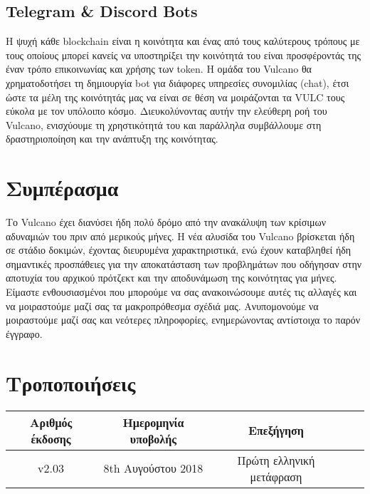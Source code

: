 \documentclass[A4paper, 12pt]{article}
\begin{document}
\subsection{Telegram \& Discord Bots}
Η ψυχή κάθε blockchain είναι η κοινότητα και ένας από τους καλύτερους τρόπους με τους οποίους μπορεί κανείς να υποστηρίξει την κοινότητά του είναι προσφέροντάς της έναν τρόπο επικοινωνίας και χρήσης των token. Η ομάδα του Vulcano θα χρηματοδοτήσει τη δημιουργία bot για διάφορες υπηρεσίες συνομιλίας (chat), έτσι ώστε τα μέλη της κοινότητάς μας να είναι σε θέση να μοιράζονται τα VULC τους εύκολα με τον υπόλοιπο κόσμο. Διευκολύνοντας αυτήν την ελεύθερη ροή του Vulcano, ενισχύουμε τη χρηστικότητά του και παράλληλα συμβάλλουμε στη δραστηριοποίηση και την ανάπτυξη της κοινότητας.

\section{Συμπέρασμα}
Το Vulcano έχει διανύσει ήδη πολύ δρόμο από την ανακάλυψη των κρίσιμων αδυναμιών του πριν από μερικούς μήνες. Η νέα αλυσίδα του Vulcano βρίσκεται ήδη σε στάδιο δοκιμών, έχοντας διευρυμένα χαρακτηριστικά, ενώ έχουν καταβληθεί ήδη σημαντικές προσπάθειες για την αποκατάσταση των προβλημάτων που οδήγησαν στην αποτυχία του αρχικού πρότζεκτ και την αποδυνάμωση της κοινότητας για μήνες. Είμαστε ενθουσιασμένοι που μπορούμε να σας ανακοινώσουμε αυτές τις αλλαγές και να μοιραστούμε μαζί σας τα μακροπρόθεσμα σχέδιά μας. Ανυπομονούμε να μοιραστούμε μαζί σας και νεότερες πληροφορίες, ενημερώνοντας αντίστοιχα το παρόν έγγραφο.

\newpage
\section{Τροποποιήσεις}

\begin{table}[h]
\centering
\begin{tabular}{@{}ccccc@{}}
\toprule
Αριθμός έκδοσης & Ημερομηνία υποβολής & Επεξήγηση \\ \midrule
v2.03 & 8th Αυγούστου 2018 & Πρώτη ελληνική μετάφραση \\
 \bottomrule
\end{tabular}
\end{table}
\end{document}

